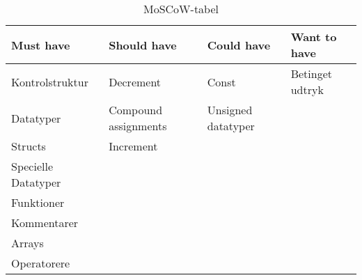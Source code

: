 %
%
\begin{table}[H]
\begin{tabular}{|m{10em}|m{12em}|m{10em}|m{8em}|}
\hline
\textbf{Must have} & \textbf{Should have} & \textbf{Could have} & \textbf{Want to have} \\ \hline
Kontrolstruktur & Decrement & Const & Betinget udtryk   \\ \hline
Datatyper & Compound assignments & Unsigned datatyper  & \\ \hline
Structs & Increment &  &	   \\ \hline
Specielle Datatyper	&  &  &		   \\ \hline
Funktioner &  &  & 		   \\ \hline
Kommentarer &  &  & 		   \\ \hline
Arrays &  &  & 	   \\ \hline
Operatorere &  &  & 		   \\ \hline
 
 
 
 

\end{tabular}
\caption{MoSCoW-tabel}
\label{tab:moscow}
\end{table}

